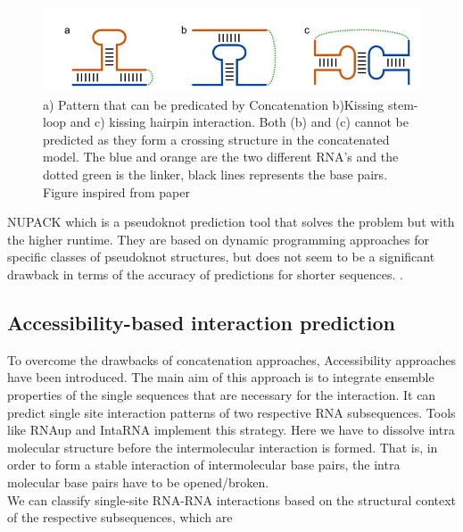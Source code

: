 \documentclass[twoside,a4paper]{report}
\numberwithin{equation}{section}
\begin{document}
	 \begin{figure}[tb]
		\includegraphics[width=0.9\linewidth]{concat}
		\centering
		\caption{a) Pattern that can be predicated by Concatenation b)Kissing stem-loop and c) kissing hairpin interaction. Both (b) and (c) cannot be predicted as they form a crossing structure in the concatenated model. The blue and orange are the two different RNA's and the dotted green is the linker, black lines represents the base pairs. Figure inspired from paper \citep{raden2018interactive}} 
		\label{Fig:concat}
	\end{figure}
	
	NUPACK which is a pseudoknot prediction tool that solves the problem but with the higher runtime. They are based on dynamic programming approaches for specific classes of pseudoknot structures, but does not seem to be a significant drawback in terms of the accuracy of predictions for shorter sequences. \citep{dirks2003partition}. \\
	
	\subsection{Accessibility-based interaction prediction }
	 To overcome the drawbacks of concatenation approaches, Accessibility approaches have been introduced. The main aim of this approach is to integrate ensemble properties of the single sequences that are necessary for the interaction. It can predict single site interaction patterns of two respective RNA subsequences. Tools like RNAup and IntaRNA implement this strategy. Here we have to dissolve intra molecular structure before the intermolecular interaction is formed. That is, in order to form a stable interaction of intermolecular base pairs, the intra molecular base pairs have to be opened/broken. \\
	

	We can classify single-site RNA-RNA interactions based on the structural context of the respective subsequences, which are\\
	
\end{document}
